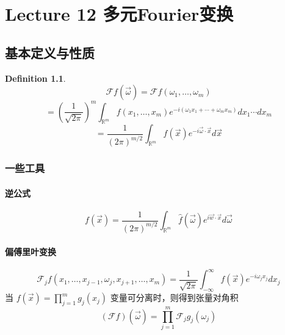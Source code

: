 \documentclass[linespread=1.5,openany]{book}%
\theoremstyle{plain}
\newtheorem{definition}{Definition}
\begin{document}
{{{				}
				
			}
			\part{Lecture 12 多元Fourier变换}
			{
				
				\chapter{基本定义与性质}
				{
					\begin{definition}
						\[
						\mathcal{F}f(\vec{\omega})= \mathcal{F}f(\omega_1, \dots, \omega_m) \]
						\[= \left(\frac{1}{\sqrt{2\pi}}\right)^m \int _{\mathbb{R}^m}{ f(x_1, \dots, x_m) e^{-i(\omega_1x_1 + \cdots + \omega_mx_m)}  }dx_1 \cdots dx_m \]
						\[= \frac{1}{(2\pi)^{m/2}} \int _{\mathbb{R}^m} f(\vec{x}) e^{-i \vec{\omega} \cdot \vec{x}} d\vec{x}\]
					\end{definition}
					\section{一些工具}
					\subsection{逆公式}
					\[	f(\vec{x}) = \frac{1}{(2\pi)^{m/2}} \int _{\mathbb{R}^m} \hat{f}(\vec{\omega}) e^{i \vec{w} \cdot \vec{x}} d\vec{\omega}\]
					\subsection{偏傅里叶变换}
					\[\mathcal{F}_j f(x_1, \dots, x_{j-1},\omega_j, x_{j+1}, \dots, x_m) = \frac{1}{\sqrt{2\pi}} \int _{-\infty}^{\infty} f(\vec{x}) e^{-i \omega_j x_j}dx_j\]
					当 $f(\vec{x}) = \prod_{j=1}^m g_j(x_j)$ 变量可分离时，则得到张量对角积
					\[(\mathcal{F}f)(\vec{\omega}) = \prod_{j=1}^m \mathcal{F}_j g_j(\omega_j)
					\]
					
}}}
\end{document}
